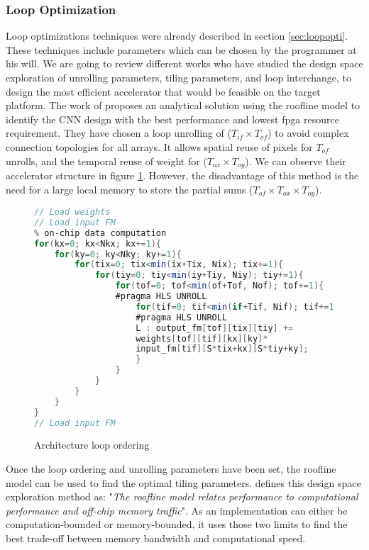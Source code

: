 \subsubsection{Loop Optimization} \label{subsec:loopopti}
%
%
Loop optimizations techniques were already described in section \ref{sec:loopopti}. These techniques include parameters which can be chosen by the programmer at his will. We are going to review different works who have studied the design space exploration of unrolling parameters, tiling parameters, and loop interchange, to design the most efficient accelerator that would be feasible on the target platform. \newline \newline
%
The work of \cite{zhang_optimizing_2015} proposes an analytical solution using the roofline model \cite{williams_roofline_2009} to identify the CNN design with the best performance and lowest \acrshort{fpga} resource requirement. They have chosen a loop unrolling of ($T_{if} \times T_{of}$) to avoid complex connection topologies for all arrays. It allows spatial reuse of pixels for $T_{of}$ unrolls, and the temporal reuse of weight for ($T_{ox} \times T_{oy}$). We can observe their accelerator structure in figure \ref{lst:accelerator}. However, the disadvantage of this method is the need for a large local memory to store the partial sums ($T_{of} \times T_{ox} \times T_{oy}$).
%
\begin{figure}
    \centering
    \begin{lstlisting}[language=Java]
// Load weights
// Load input FM
% on-chip data computation
for(kx=0; kx<Nkx; kx+=1){
    for(ky=0; ky<Nky; ky+=1){
        for(tix=0; tix<min(ix+Tix, Nix); tix+=1){
            for(tiy=0; tiy<min(iy+Tiy, Niy); tiy+=1){
                for(tof=0; tof<min(of+Tof, Nof); tof+=1){
                #pragma HLS UNROLL
                    for(tif=0; tif<min(if+Tif, Nif); tif+=1){
                    #pragma HLS UNROLL
                    L : output_fm[tof][tix][tiy] +=
                    weights[tof][tif][kx][ky]*
                    input_fm[tif][S*tix+kx][S*tiy+ky];
                    }
                }
            }
        }
    }
}
// Load input FM
    \end{lstlisting}
    \caption{Architecture loop ordering \cite{zhang_optimizing_2015}}
    \label{lst:accelerator}
\end{figure} \newline
%
Once the loop ordering and unrolling parameters have been set, the roofline model can be used to find the optimal tiling parameters. \textcite{mittal_survey_2020} defines this design space exploration method as: "\textit{The roofline model relates performance to computational performance and off-chip memory traffic}". As an implementation can either be computation-bounded or memory-bounded, it uses those two limits to find the best trade-off between memory bandwidth and computational speed.
